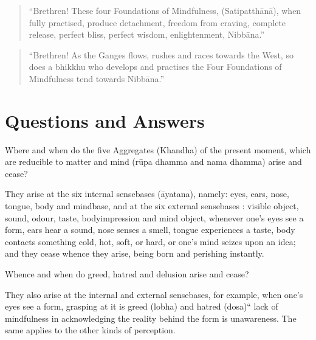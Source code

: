 \documentclass[a5paper,10pt,english]{book}
\begin{document}
\sphinxAtStartPar
{}
\begin{quote}

\sphinxAtStartPar
“Brethren! These four Foundations of Mindfulness, (Satipatthānā), when fully practised, produce detachment, freedom from craving, complete release, perfect bliss, perfect wisdom, enlightenment, Nibbāna.”
\end{quote}

\sphinxAtStartPar
{}
\begin{quote}

\sphinxAtStartPar
“Brethren! As the Ganges flows, rushes and races towards the West, so does a bhikkhu who develops and practises the Four Foundations of Mindfulness tend towards Nibbāna.”
\end{quote}


\section{Questions and Answers}
\label{\detokenize{path:questions-and-answers}}
\sphinxAtStartPar
{} Where and when do the five Aggregates (Khandha) of the present moment, which are reducible to matter and mind (rūpa dhamma and nama dhamma) arise and cease?

\sphinxAtStartPar
{} They arise at the six internal sense\sphinxhyphen{}bases (āyatana), namely: eyes, ears, nose, tongue, body and mind\sphinxhyphen{}base, and at the six external sense\sphinxhyphen{}bases : visible object, sound, odour, taste, body\sphinxhyphen{}impression and mind object, whenever one’s eyes see a form, ears hear a sound, nose senses a smell, tongue experiences a taste, body contacts something cold, hot, soft, or hard, or one’s mind seizes upon an idea; and they cease whence they arise, being born and perishing instantly.

\sphinxAtStartPar
{} Whence and when do greed, hatred and delusion arise and cease?

\sphinxAtStartPar
{} They also arise at the internal and external sense\sphinxhyphen{}bases, for example, when one’s eyes see a form, grasping at it is greed (lobha) and hatred (dosa)“ lack of mindfulness in acknowledging the reality behind the form is unawareness. The same applies to the other kinds of perception.
\end{document}
